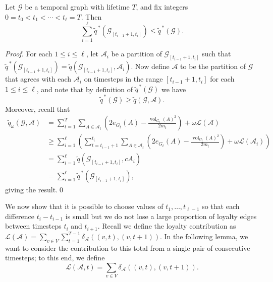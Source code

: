 \documentclass[runningheads]{llncs}
\DeclareMathOperator{\vol}{vol}
\newcommand{\cA}{\mathcal{A}}
\newcommand{\cG}{\mathcal{G}}
\newcommand{\loy}{\mathcal{L}}
\begin{document}
\begin{lemma}\label{lem:interval-approx-ub}
    Let $\cG$ be a temporal graph with lifetime $T$, and fix integers $0 = t_0 < t_1 < \cdots < t_{\ell} = T$.  Then
    $$ \sum_{i=1}^{\ell} \widetilde{q}^{\,*}(\cG_{[t_{i-1}+1,t_i]}) \leq \widetilde{q}^{\,*}(\cG).$$
\end{lemma}
\begin{proof}
    For each $1 \le i \le \ell$, let $\cA_i$ be a partition of $\cG_{[t_{i-1}+1,t_i]}$ such that $\widetilde{q}^{\,*}(\cG_{[t_{i-1}+1,t_i]}) = \widetilde{q}(\cG_{[t_{i-1}+1,t_i]},\cA_i)$.  Now define $\cA$ to be the partition of $\cG$ that agrees with each $\cA_i$ on timesteps in the range $[t_{i-1}+1,t_i]$ for each $1 \le i \le \ell$, and note that by definition of $\widetilde{q}^{\,*}(\cG)$ we have
    \[
        \widetilde{q}^{\,*}(\cG) \geq \widetilde{q}(\cG,\cA).
    \]
    Moreover, recall that
    \begin{align*}
        \widetilde{q}_\omega(\cG, \cA) &= \sum_{t=1}^T \sum_{A \in \cA_t} \left( 2e_{G_t}(A) - \frac{\vol_{G_t}(A)^2}{2m_t}\right) + \omega \loy(\cA) \\
            &\geq \sum_{i=1}^\ell \left( \sum_{t=t_{i-1}+1}^{t_i} \sum_{A \in \cA_t} \left( 2e_{G_t}(A) - \frac{\vol_{G_t}(A)^2}{2m_t}\right) + \omega \loy(\cA_i)\right) \\
            &= \sum_{i=1}^\ell \widetilde{q}(\cG_{[t_{i-1}+1,t_i]},cA_i)\\
            &= \sum_{i=1}^\ell \widetilde{q}^{\,*}(\cG_{[t_{i-1}+1,t_i]}),
    \end{align*}
    giving the result.\qed
\end{proof}

We now show that it is possible to choose values of $t_1,\dots,t_{\ell-1}$ so that each difference $t_i - t_{i-1}$ is small but we do not lose a large proportion of loyalty edges between timesteps $t_i$ and $t_{i+1}$. Recall we define the loyalty contribution as 
    $\loy(\cA) = \sum_{v \in V} \sum_{t=1}^{T-1} \delta_\cA((v,t),(v,t+1))$.
In the following lemma, we want to consider the contribution to this total from a single pair of consecutive timesteps; to this end, we define 
    $$\loy(\cA,t) = \sum_{v \in V} \delta_\cA((v,t),(v,t+1)).$$
\end{document}
